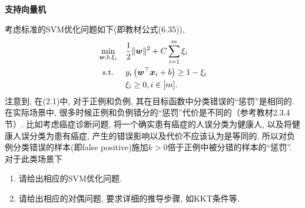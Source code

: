 \documentclass[answers]{exam}  %
\begin{document}
\begin{questions}
    \begin{solution}
    \end{solution}


    \question [20] \textbf{支持向量机}

    考虑标准的SVM优化问题如下(即教材公式(6.35)),
    \begin{equation}
        \begin{aligned}
            \min _{\boldsymbol{w}, b, \xi_{i}} \quad & \frac{1}{2}\|\boldsymbol{w}\|^{2}+C \sum_{i=1}^{m} \xi_{i}     \\
            \text { s.t. } \quad          & y_{i}\left(\boldsymbol{w}^\top {\boldsymbol{x}}_{i}+b\right) \geq 1-\xi_{i} \\
                                          & \xi_{i} \geq 0, i\in [m] .
        \end{aligned}
    \end{equation}
    注意到, 在(2.1)中, 对于正例和负例, 其在目标函数中分类错误的“惩罚”是相同的. 在实际场景中, 很多时候正例和负例错分的“惩罚”代价是不同的（参考教材2.3.4节）. 比如考虑癌症诊断问题, 将一个确实患有癌症的人误分类为健康人, 以及将健康人误分类为患有癌症, 产生的错误影响以及代价不应该认为是等同的. 所以对负例分类错误的样本(即false positive)施加$k>0$倍于正例中被分错的样本的“惩罚”. 对于此类场景下
    \begin{enumerate}
        \item 请给出相应的SVM优化问题.
        \item 请给出相应的对偶问题, 要求详细的推导步骤, 如KKT条件等.
    \end{enumerate}


\end{questions}
\end{document}
